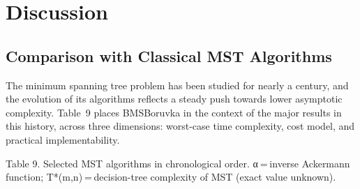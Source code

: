 \documentclass[11pt]{article}
\theoremstyle{plain}
\theoremstyle{remark}
\begin{document}
\section{Discussion}

\subsection{Comparison with Classical MST Algorithms}

The minimum spanning tree problem has been studied for nearly a century,
and the evolution of its algorithms reflects a steady push towards lower
asymptotic complexity. Table~9 places BMSBoruvka in the context of the
major results in this history, across three dimensions: worst-case time
complexity, cost model, and practical implementability.

\hspace{0pt} Table 9. Selected MST algorithms in chronological order.
α = inverse Ackermann function; T*(m,n) = decision-tree complexity of
MST (exact value unknown).
\end{document}
